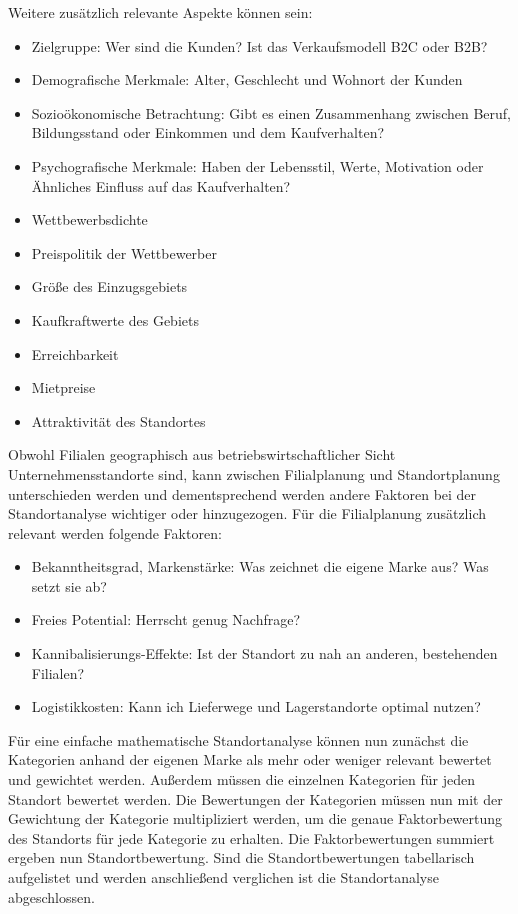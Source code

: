 \newpage
Weitere zusätzlich relevante Aspekte können sein:
\begin{itemize}
	\item Zielgruppe: Wer sind die Kunden? Ist das Verkaufsmodell B2C oder B2B?
	\item Demografische Merkmale: Alter, Geschlecht und Wohnort der Kunden
	\item Sozioökonomische Betrachtung: Gibt es einen Zusammenhang zwischen Beruf, Bildungsstand oder Einkommen und dem Kaufverhalten?
	\item Psychografische Merkmale: Haben der Lebensstil, Werte, Motivation oder Ähnliches Einfluss auf das Kaufverhalten?
	\item Wettbewerbsdichte
	\item Preispolitik der Wettbewerber
	\item Größe des Einzugsgebiets
	\item Kaufkraftwerte des Gebiets
	\item Erreichbarkeit
	\item Mietpreise
	\item Attraktivität des Standortes
\end{itemize}

Obwohl Filialen geographisch aus betriebswirtschaftlicher Sicht Unternehmensstandorte sind, kann zwischen Filialplanung und Standortplanung unterschieden werden und dementsprechend werden andere Faktoren bei der Standortanalyse wichtiger oder hinzugezogen.
Für die Filialplanung zusätzlich relevant werden folgende Faktoren:

\begin{itemize}
	\item Bekanntheitsgrad, Markenstärke: Was zeichnet die eigene Marke aus? Was setzt sie ab?
	\item Freies Potential: Herrscht genug Nachfrage?
	\item Kannibalisierungs-Effekte: Ist der Standort zu nah an anderen, bestehenden Filialen?
	\item Logistikkosten: Kann ich Lieferwege und Lagerstandorte optimal nutzen?
\end{itemize}

Für eine einfache mathematische Standortanalyse können nun zunächst die Kategorien anhand der eigenen Marke als mehr oder weniger relevant bewertet und gewichtet werden.
Außerdem müssen die einzelnen Kategorien für jeden Standort bewertet werden. 
Die Bewertungen der Kategorien müssen nun mit der Gewichtung der Kategorie multipliziert werden, um die genaue Faktorbewertung des Standorts für jede Kategorie zu erhalten. 
Die Faktorbewertungen summiert ergeben nun Standortbewertung. 
Sind die Standortbewertungen tabellarisch aufgelistet und werden anschließend verglichen ist die Standortanalyse abgeschlossen.

